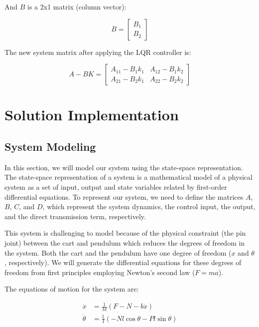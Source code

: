 \documentclass[11pt,twocolumn,twoside,lineno]{pnas-new}
\begin{document}
And \(B\) is a 2x1 matrix (column vector):

\begin{equation}
B = \begin{bmatrix} B_{1} \\ B_{2} \end{bmatrix}
\end{equation}

The new system matrix after applying the LQR controller is:

\begin{equation}
A - BK = \begin{bmatrix} A_{11} - B_{1}k_{1} & A_{12} - B_{1}k_{2} \\ A_{21} - B_{2}k_{1} & A_{22} - B_{2}k_{2} \end{bmatrix}
\end{equation}


\section{Solution Implementation}
\subsection{System Modeling}
In this section, we will model our system using the state-space representation. The state-space representation of a system is a mathematical model of a physical system as a set of input, output and state variables related by first-order differential equations. To represent our system, we need to define the matrices \(A\), \(B\), \(C\), and \(D\), which represent the system dynamics, the control input, the output, and the direct transmission term, respectively. 

This system is challenging to model because of the physical constraint (the pin joint) between the cart and pendulum which reduces the degrees of freedom in the system. Both the cart and the pendulum have one degree of freedom (\(x\) and \(\theta\), respectively). We will generate the differential equations for these degrees of freedom from first principles employing Newton's second law (\(F = ma\)).

The equations of motion for the system are:

\begin{align}
\ddot{x} &= \frac{1}{M}(F - N - b\dot{x}) \\
\ddot{\theta} &= \frac{1}{I}(-Nl\cos\theta - Pl\sin\theta)
\end{align}
\end{document}
